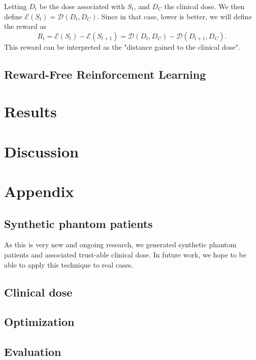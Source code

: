 Letting $D_t$ be the dose associated with $S_t$, and $D_C$ the clinical dose.
We then define $\mathcal{E}(S_t) = \mathcal{D}(D_t, D_C)$.
Since in that case, lower is better, we will define the reward as $$R_t = \mathcal{E}(S_t) - \mathcal{E}(S_{t+1}) = \mathcal{D}(D_t, D_C) - \mathcal{D}(D_{t+1}, D_C).$$
This reward can be interpreted as the "distance gained to the clinical dose".


\subsection{Reward-Free Reinforcement Learning}


\section{Results}

\section{Discussion}



\section*{Appendix}

\subsection*{Synthetic phantom patients}
As this is very new and ongoing research, we generated synthetic phantom patients and associated trust-able clinical dose.
In future work, we hope to be able to apply this technique to real cases.

\subsection*{Clinical dose}

\subsection*{Optimization}

\subsection*{Evaluation}

